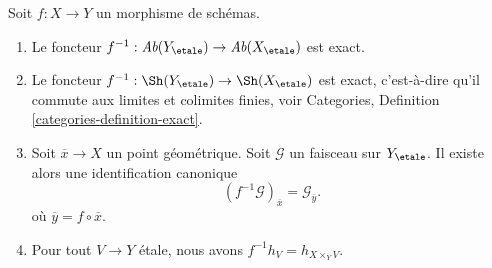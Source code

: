 \begin{lemma}
\label{lemma-stalk-pullback}
Soit $f : X \to Y$ un morphisme de sch\'emas.
\begin{enumerate}
\item Le foncteur
$f^{-1} : \textit{Ab}(Y_\etale) \to \textit{Ab}(X_\etale)$
est exact.
\item Le foncteur
$f^{-1} : \Sh(Y_\etale) \to \Sh(X_\etale)$
est exact, c'est-\`a-dire qu'il commute aux limites et colimites finies, voir
Categories, Definition \ref{categories-definition-exact}.
\item Soit $\overline{x} \to X$ un point g\'eom\'etrique.
Soit $\mathcal{G}$ un faisceau sur $Y_\etale$.
Il existe alors une identification canonique
$$
(f^{-1}\mathcal{G})_{\overline{x}} = \mathcal{G}_{\overline{y}}.
$$
o\`u $\overline{y} = f \circ \overline{x}$.
\item Pour tout $V \to Y$ \'etale, nous avons $f^{-1}h_V = h_{X \times_Y V}$.
\end{enumerate}
\end{lemma}

